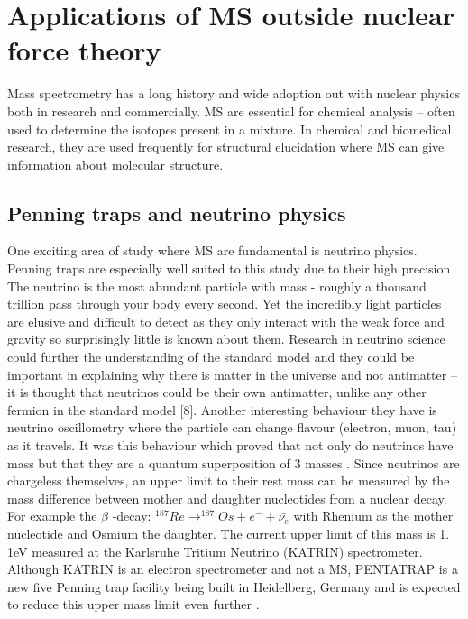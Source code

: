 \section{Applications of MS outside nuclear force theory}

Mass spectrometry has a long history and wide adoption out with nuclear physics both in research and commercially.
MS are essential for chemical analysis – often used to determine the isotopes present in a mixture.
In chemical and biomedical research, they are used frequently for structural elucidation where MS can give information about molecular structure. \cite{bhattarai_chapter_2020}

\subsection{Penning traps and neutrino physics}
One exciting area of study where MS are fundamental is neutrino physics.
Penning traps are especially well suited to this study due to their high precision 
The neutrino is the most abundant particle with mass - roughly a thousand trillion pass through your body every second. \cite{noauthor_whats_nodate}
Yet the incredibly light particles are elusive and difficult to detect as they only interact with the weak force and gravity so surprisingly little is known about them. \cite{noauthor_what_nodate}
Research in neutrino science could further the understanding of the standard model and they could be important in explaining why there is matter in the universe and not antimatter \cite{gibney_morphing_2015} – it is thought that neutrinos could be their own antimatter, unlike any other fermion in the standard model [8].
Another interesting behaviour they have is neutrino oscillometry where the particle can change flavour (electron, muon, tau) as it travels.
It was this behaviour which proved that not only do neutrinos have mass but that they are a quantum superposition of 3 masses \cite{gibney_morphing_2015}.
Since neutrinos are chargeless themselves, an upper limit to their rest mass can be measured by the mass difference between mother and daughter nucleotides from a nuclear decay. \cite{eliseev_penning-trap_2013}
For example the $\beta$ -decay: $^{187}Re \longrightarrow ^{187}Os + e^- + \bar{\nu _e}$ with Rhenium as the mother nucleotide and Osmium the daughter. \cite{repp_pentatrap_2012}
The current upper limit of this mass is 1.
1eV measured at the Karlsruhe Tritium Neutrino (KATRIN) spectrometer. \cite{castelvecchi_physicists_2019}
Although KATRIN is an electron spectrometer and not a MS, PENTATRAP is a new five Penning trap facility being built in Heidelberg, Germany and is expected to reduce this upper mass limit even further \cite{repp_pentatrap_2012}.

